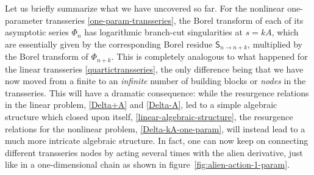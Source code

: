 \documentclass[11pt,a4paper]{article}
\begin{document}
Let us briefly summarize what we have uncovered so far. For the nonlinear one-parameter transseries \eqref{one-param-transseries}, the Borel transform of each of its asymptotic series $\Phi_n$ has logarithmic branch-cut singularities at $s = k A$, which are essentially given by the corresponding Borel residue $\mathsf{S}_{n\to n+k}$, multiplied by the Borel transform of $\Phi_{n+k}$. This is completely analogous to what happened for the linear transseries \eqref{quartictransseries}, the only difference being that we have now moved from a finite to an \textit{infinite} number of building blocks or \textit{nodes} in the transseries. This will have a dramatic consequence: while the resurgence relations in the linear problem, \eqref{Delta+A} and \eqref{Delta-A}, led to a simple algebraic structure which closed upon itself, \eqref{linear-algebraic-structure}, the resurgence relations for the nonlinear problem, \eqref{Delta-kA-one-param}, will instead lead to a much more intricate algebraic structure. In fact, one can now keep on connecting different transseries nodes by acting several times with the alien derivative, just like in a one-dimensional chain as shown in figure~\ref{fig:alien-action-1-param}.
\end{document}
